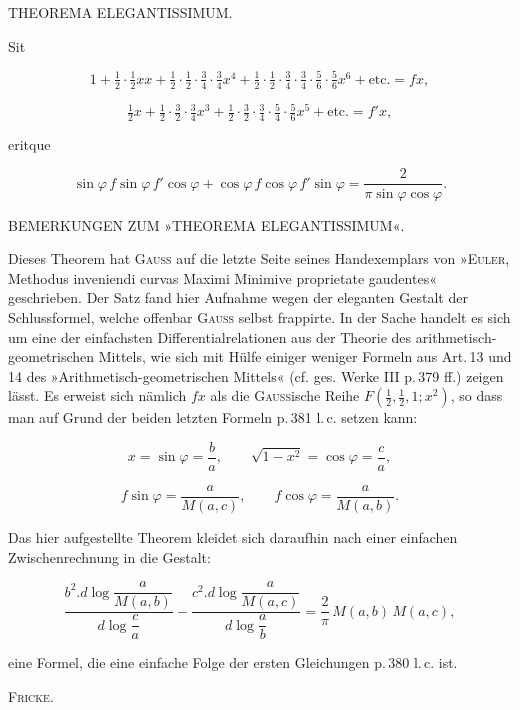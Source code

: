 \clearpage
{}%

\begin{center}
\large THEOREMA ELEGANTISSIMUM.
\end{center}

\bigskip

\noindent\hspace*{\parindent}Sit

\[ 1+\tfrac{1}{2}\cdot\tfrac{1}{2}xx+\tfrac{1}{2}\cdot\tfrac{1}{2}\cdot\tfrac{3}{4}\cdot\tfrac{3}{4}x^4+\tfrac{1}{2}\cdot\tfrac{1}{2}\cdot\tfrac{3}{4}\cdot\tfrac{3}{4}\cdot\tfrac{5}{6}\cdot\tfrac{5}{6}x^6+\text{etc.} = fx, \]

\[ \tfrac{1}{2}x+\tfrac{1}{2}\cdot\tfrac{3}{2}\cdot\tfrac{3}{4}x^3+\tfrac{1}{2}\cdot\tfrac{3}{2}\cdot\tfrac{3}{4}\cdot\tfrac{5}{4}\cdot\tfrac{5}{6}x^5+\text{etc.} = f'x, \]

\noindent eritque

\[ \sin\varphi\, f\sin\varphi\, f'\cos\varphi + \cos\varphi\, f\cos\varphi\, f'\sin\varphi = \frac{2}{\pi\sin\varphi\cos\varphi}. \]

\bigskip

\bigskip

\begin{center}
BEMERKUNGEN ZUM »THEOREMA ELEGANTISSIMUM«.
\end{center}

\noindent\hspace*{\parindent}Dieses Theorem hat \textsc{Gauss} auf die letzte Seite seines Handexemplars von »\textsc{Euler}, Methodus inveniendi curvas Maximi Minimive proprietate gaudentes« geschrieben. Der Satz fand hier Aufnahme wegen der eleganten Gestalt der Schlussformel, welche offenbar \textsc{Gauss} selbst frappirte. In der Sache handelt es sich um eine der einfachsten Differentialrelationen aus der Theorie des arithmetisch-geometrischen Mittels, wie sich mit Hülfe einiger weniger Formeln aus Art.\,13 und 14 des »Arithmetisch-geometrischen Mittels« (cf. ges. Werke III p.\,379 ff.) zeigen lässt. Es erweist sich nämlich $fx$ als die \textsc{Gauss}ische Reihe $F(\tfrac{1}{2},\tfrac{1}{2},1;x^2)$, so dass man auf Grund der beiden letzten Formeln p.\,381 l.\,c. setzen kann:

\[ x=\sin\varphi=\frac{b}{a}, \qquad \sqrt{1-x^2}=\cos\varphi=\frac{c}{a}, \]

\[ f\sin\varphi=\frac{a}{M( a,c)}, \qquad f\cos\varphi=\frac{a}{M( a,b)}. \]

\noindent Das hier aufgestellte Theorem kleidet sich daraufhin nach einer einfachen Zwischenrechnung in die Gestalt:

\[ \frac{b^2\mathord{.} d\log\dfrac{a}{M( a,b)}}{d\log\dfrac{c}{a}} - \frac{c^2\mathord{.} d\log\dfrac{a}{M( a,c)}}{d\log\dfrac{a}{b}} = \frac{2}{\pi}\,M( a,b)\,M( a,c), \]

\noindent eine Formel, die eine einfache Folge der ersten Gleichungen p.\,380 l.\,c. ist.

\hfill \textsc{Fricke}.

\bigskip

